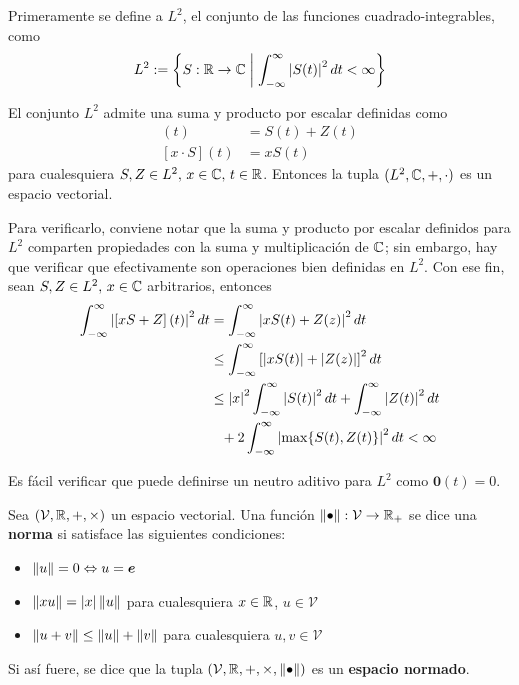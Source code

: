 \begin{ejemplo}
Primeramente se define a $L^2$, el conjunto de las funciones cuadrado-integrables, como
\begin{equation}
L^2 := \left\{ S: \mathbb{R}\rightarrow\mathbb{C} \mathrel{}\middle|\mathrel{} \int_{-\infty}^{\infty} \left| S(t) \right|^2 dt < \infty \right\}
\end{equation}

El conjunto $L^2$ admite una suma y producto por escalar definidas como
\begin{align}
[S+Z](t) &= S(t) + Z(t) \\
[x\cdot S](t) &= x S(t)
\end{align}
para cualesquiera $S, Z \in L^{2}, \, x\in \mathbb{C}, \, t\in \mathbb{R}$. 
%
Entonces la tupla $(L^{2}, \mathbb{C},+,\cdot)$ es un espacio vectorial.

Para verificarlo, conviene notar que la suma y producto por escalar definidos para $L^{2}$ comparten propiedades con la suma y multiplicación de $\mathbb{C}$; sin embargo, hay que verificar que efectivamente son operaciones bien definidas en $L^{2}$.
%
Con ese fin, sean $S, Z \in L^{2}, \, x \in \mathbb{C}$ arbitrarios, entonces
\begin{align*}
\intR \abso{\left[x S + Z\right]\left(t\right)}^2 dt 
&= 
\intR \abso{ xS(t) + Z(z)}^2 dt \\
&\leq
\intR \left[ \abso{ xS(t)} + \abso{ Z(z)} \right]^2 dt \\
&\leq
\abso{x}^{2} \intR \abso{ S(t)}^{2} dt + \intR \abso{ Z(t)}^{2} dt \\
&\pheq
+ 2\intR \abso{ \max\{ S(t), Z(t) \} }^{2} dt < \infty
\end{align*}

Es fácil verificar que puede definirse un neutro aditivo para $L^{2}$ como $\boldsymbol{0}(t) = 0$.
\end{ejemplo}

\begin{definicion}
Sea $(\mathcal{V},\mathbb{R},+,\times)$ un espacio vectorial. Una función $\left\Vert \bullet \right\Vert: \mathcal{V}\rightarrow\mathbb{R}_+$ se dice una \textbf{norma} si satisface las siguientes condiciones:
\begin{itemize}
\item $\left\Vert u \right\Vert = 0 \Leftrightarrow u = \boldsymbol{e}$
\item $\left\Vert x u \right\Vert = \left| x \right| \left\Vert u \right\Vert$ para cualesquiera $x \in \mathbb{R}$, $u \in \mathcal{V}$
\item $\left\Vert u+v \right\Vert \leq \left\Vert u \right\Vert + \left\Vert v \right\Vert$ para cualesquiera $u, v \in \mathcal{V}$
\end{itemize}
Si así fuere, se dice que la tupla $(\mathcal{V},\mathbb{R},+,\times, \left\Vert \bullet \right\Vert)$ es un \textbf{espacio normado}.
\end{definicion}

